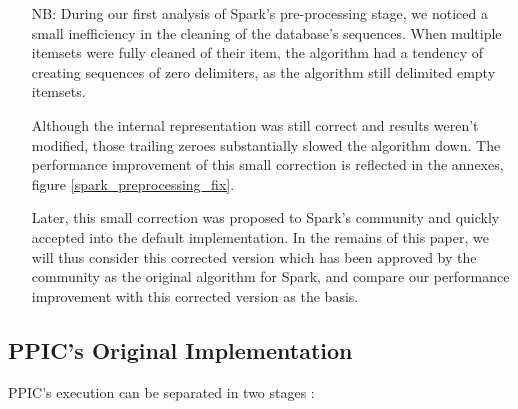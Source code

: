 \documentclass{eplmastersthesis}
\begin{document}
\begin{itemize}
  \item[NB:] During our first analysis of Spark's pre-processing stage, we noticed a small inefficiency in the cleaning of the database's sequences. When multiple itemsets were fully cleaned of their item, the algorithm had a tendency of creating sequences of zero delimiters, as the algorithm still delimited empty itemsets.

Although the internal representation was still correct and results weren't modified, those trailing zeroes substantially slowed the algorithm down.
The performance improvement of this small correction is reflected in the annexes, figure \ref{spark_preprocessing_fix}.

Later, this small correction was proposed to Spark's community and quickly accepted into the default implementation. In the remains of this paper, we will thus consider this corrected version which has been approved by the community as the original algorithm for Spark, and compare our performance improvement with this corrected version as the basis.
\end{itemize}

\subsection{PPIC's Original Implementation}

PPIC's execution can be separated in two stages :
\end{document}
